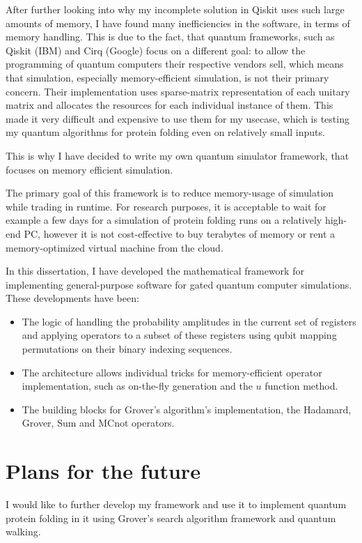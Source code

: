 After further looking into why my incomplete solution in Qiskit uses such large amounts of memory, I have found many inefficiencies in the software, in terms of memory handling. This is due to the fact, that quantum frameworks, such as Qiskit (IBM) and Cirq (Google) focus on a different goal: to allow the programming of quantum computers their respective vendors sell, which means that simulation, especially memory-efficient simulation, is not their primary concern. Their implementation uses sparse-matrix representation of each unitary matrix and allocates the resources for each individual instance of them. This made it very difficult and expensive to use them for my usecase, which is testing my quantum algorithms for protein folding even on relatively small inputs.

This is why I have decided to write my own quantum simulator framework, that focuses on memory efficient simulation.

The primary goal of this framework is to reduce memory-usage of simulation while trading in runtime. For research purposes, it is acceptable to wait for example a few days for a simulation of protein folding runs on a relatively high-end PC, however it is not cost-effective to buy terabytes of memory or rent a memory-optimized virtual machine from the cloud.

In this dissertation, I have developed the mathematical framework for implementing general-purpose software for gated quantum computer simulations. These developments have been:

\begin{itemize}
    \item The logic of handling the probability amplitudes in the current set of registers and applying operators to a subset of these registers using qubit mapping permutations on their binary indexing sequences.
    \item The architecture allows individual tricks for memory-efficient operator implementation, such as on-the-fly generation and the $u$ function method.
    \item The building blocks for Grover's algorithm's implementation, the Hadamard, Grover, Sum and MCnot operators.
\end{itemize}

\section{Plans for the future}

I would like to further develop my framework and use it to implement quantum protein folding in it using Grover's search algorithm framework and quantum walking.


